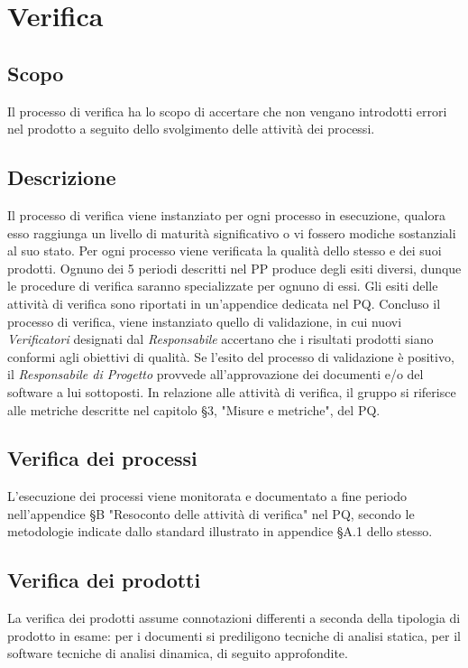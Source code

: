 \documentclass[../NormediProgetto.tex]{subfiles}
\begin{document}
	
	
	
\section{Verifica}

\subsection{Scopo}
Il processo di verifica ha lo scopo di accertare che non vengano introdotti errori nel prodotto a seguito dello svolgimento delle attività dei processi.

\subsection{Descrizione}

Il processo di verifica viene instanziato per ogni processo in esecuzione, qualora esso raggiunga un livello di maturità significativo o vi fossero modiche sostanziali al suo stato. Per ogni processo viene verificata la qualità dello stesso e dei suoi prodotti. Ognuno dei 5 periodi descritti nel PP produce degli esiti diversi, dunque le procedure di verifica saranno specializzate per ognuno di essi. Gli esiti delle attività di
verifica sono riportati in un'appendice dedicata nel PQ. Concluso il processo di verifica, viene instanziato quello di validazione, in cui nuovi \textit{Verificatori} designati dal \textit{Responsabile} accertano che i risultati prodotti siano conformi agli obiettivi di qualità. Se l'esito del processo di validazione è positivo, il \textit{Responsabile di Progetto} provvede all'approvazione dei documenti e/o del software a lui sottoposti.
In relazione alle attività di verifica, il gruppo si riferisce alle metriche descritte nel capitolo §3, "Misure e metriche", del PQ.

\subsection{Verifica dei processi} 
L'esecuzione dei processi viene monitorata e documentato a fine periodo nell'appendice §B "Resoconto delle attività di verifica" nel PQ, secondo le metodologie indicate dallo standard  illustrato in appendice §A.1 dello stesso.

\subsection{Verifica dei prodotti}
La verifica dei prodotti assume connotazioni differenti a seconda della tipologia di prodotto in esame: per i documenti si prediligono tecniche di analisi statica, per il software tecniche di analisi dinamica, di seguito approfondite.
\end{document}
